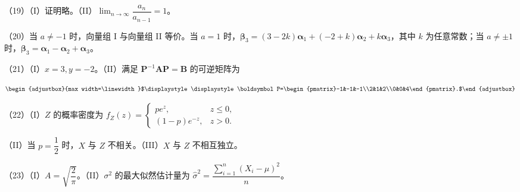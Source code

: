 \documentclass[UTF8,12pt]{ctexart}
\newcommand{\fitmath}[1]{\begin{adjustbox}{max width=\linewidth}$\displaystyle #1$\end{adjustbox}}
\begin{document}
（19）（I）证明略。（II）\(\displaystyle \lim_{n\to\infty}\dfrac{\displaystyle a_n}{\displaystyle a_{n-1}}=1\)。


（20）当 \(\displaystyle a\neq-1\) 时，向量组 I 与向量组 II 等价。当 \(\displaystyle a=1\) 时，\(\displaystyle \boldsymbol\beta_3=(3-2k)\boldsymbol\alpha_1+(-2+k)\boldsymbol\alpha_2+k\boldsymbol\alpha_3\)，其中 \(\displaystyle k\) 为任意常数；当 \(\displaystyle a\neq\pm1\) 时，\(\displaystyle \boldsymbol\beta_3=\boldsymbol\alpha_1-\boldsymbol\alpha_2+\boldsymbol\alpha_3\)。


（21）（I）\(\displaystyle x=3,\allowbreak y=-2\)。（II）满足 \(\displaystyle \boldsymbol P^{-1}\boldsymbol A\boldsymbol P=\boldsymbol B\) 的可逆矩阵为


\[\fitmath{\displaystyle \boldsymbol P=\begin{pmatrix}-1&-1&-1\\2&1&2\\0&0&4\end{pmatrix}.}\]


（22）（I）\(\displaystyle Z\) 的概率密度为 \(\displaystyle f_Z(z)=\begin{cases}pe^z,\allowbreak &z\leq0,\allowbreak \\(1-p)e^{-z},\allowbreak &z>0.\end{cases}\)


（II）当 \(\displaystyle p=\dfrac{\displaystyle 1}{\displaystyle 2}\) 时，\(\displaystyle X\) 与 \(\displaystyle Z\) 不相关。（III）\(\displaystyle X\) 与 \(\displaystyle Z\) 不相互独立。


（23）（I）\(\displaystyle A=\sqrt{\dfrac{\displaystyle 2}{\displaystyle \pi}}\)。（II）\(\displaystyle \sigma^2\) 的最大似然估计量为 \(\displaystyle \widehat{\sigma}^2=\dfrac{\displaystyle \sum_{i=1}^n(X_i-\mu)^2}{\displaystyle n}\)。


\clearpage
\end{document}
